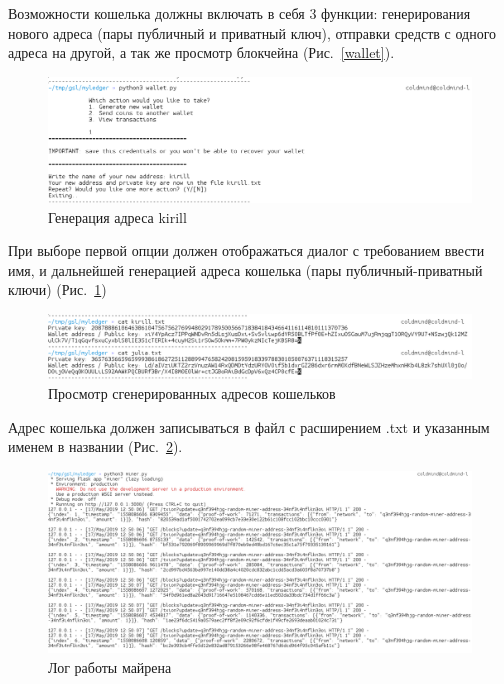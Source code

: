 Возможности кошелька должны включать в себя 3 функции: генерирования нового
адреса (пары публичный и приватный ключ), отправки средств с одного адреса на
другой, а так же просмотр блокчейна (Рис.~\ref{wallet}).

\begin{figure}[h!]
    \centering
    \includegraphics[width=\textwidth]{./screenshots/gen_kirill}
    \caption{Генерация адреса {\small kirill}}\label{gen_kirill}
\end{figure}

При выборе первой опции должен отображаться диалог с требованием ввести имя, и
дальнейшей генерацией адреса кошелька (пары публичный-приватный ключи) (Рис.~\ref{gen_kirill})

\begin{figure}[h!]
    \centering
    \includegraphics[width=\textwidth]{./screenshots/cat}
    \caption{Просмотр сгенерированных адресов кошельков}\label{cat}
\end{figure}

Адрес кошелька должен записываться в файл с расширением {\small .txt} и
указанным именем в названии (Рис.~\ref{cat}).

\begin{figure}[h!]
    \centering
    \includegraphics[width=\textwidth]{./screenshots/miner_run}
    \caption{Лог работы майрена}\label{log1}
\end{figure}

